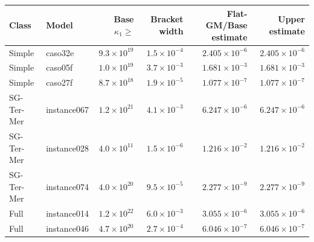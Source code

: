 \begin{tabular}{llrrrr}
\toprule
Class & Model & Base $\kappa_1\ge$ & Bracket width & Flat-GM/Base estimate & Upper estimate \\
\midrule
Simple & caso32e & $9.3\times10^{19}$ & $1.5\times10^{-4}$ & $2.405\times10^{-6}$ & $2.405\times10^{-6}$ \\
Simple & caso05f & $1.0\times10^{19}$ & $3.7\times10^{-3}$ & $1.681\times10^{-3}$ & $1.681\times10^{-3}$ \\
Simple & caso27f & $8.7\times10^{18}$ & $1.9\times10^{-5}$ & $1.077\times10^{-7}$ & $1.077\times10^{-7}$ \\
SG-Ter-Mer & instance067 & $1.2\times10^{21}$ & $4.1\times10^{-3}$ & $6.247\times10^{-6}$ & $6.247\times10^{-6}$ \\
SG-Ter-Mer & instance028 & $4.0\times10^{11}$ & $1.5\times10^{-6}$ & $1.216\times10^{-2}$ & $1.216\times10^{-2}$ \\
SG-Ter-Mer & instance074 & $4.0\times10^{20}$ & $9.5\times10^{-5}$ & $2.277\times10^{-9}$ & $2.277\times10^{-9}$ \\
Full & instance014 & $1.2\times10^{22}$ & $6.0\times10^{-3}$ & $3.055\times10^{-6}$ & $3.055\times10^{-6}$ \\
Full & instance046 & $4.7\times10^{20}$ & $2.7\times10^{-4}$ & $6.046\times10^{-7}$ & $6.046\times10^{-7}$ \\
\bottomrule
\end{tabular}

